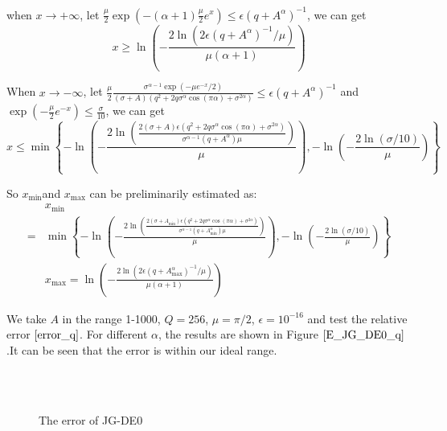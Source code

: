 when $x\rightarrow +\infty$, let $\frac{\mu}{2} \exp(-(\alpha+1)\frac{\mu}{2}e^x)\leq \epsilon (q+A^{\alpha})^{-1}$, we can get
\begin{equation}
	x\geq \ln\left(-\frac{2\ln(2\epsilon(q+A^{\alpha})^{-1}/\mu)}{\mu(\alpha+1)}\right)
\end{equation}

When $x\rightarrow -\infty$, let $\frac{\mu}{2} \frac{\sigma^{\alpha-1}\exp(-\mu e^{-x}/2)}{(\sigma+A)(q^2+2q\sigma^{\alpha}\cos(\pi\alpha)+\sigma^{2\alpha})}\leq \epsilon (q+A^{\alpha})^{-1}$ and $\exp(-\frac{\mu}{2}e^{-x})\le \frac{\sigma}{10}$, we can get
\begin{equation}
	x\leq \min \left\{-\ln\left(-\frac{2\ln\left(\frac{2(\sigma+A)\epsilon(q^2+2q\sigma^{\alpha}\cos(\pi\alpha)+\sigma^{2\alpha})}{\sigma^{\alpha-1}(q+A^{\alpha})\mu} \right)}{\mu}\right),-\ln \left(-\frac{2\ln(\sigma/10)}{\mu}\right)\right\}
\end{equation}

So  $x_{\min}$and $x_{\max}$ can be preliminarily estimated as:
\begin{equation}
	\begin{aligned}
		&x_{\min}\\
		=&\min \left\{-\ln\left(-\frac{2\ln\left(\frac{2(\sigma+A_{\min})\epsilon(q^2+2q\sigma^{\alpha}\cos(\pi\alpha)+\sigma^{2\alpha})}{\sigma^{\alpha-1}(q+A_{\min}^{\alpha})\mu} \right)}{\mu}\right),-\ln \left(-\frac{2\ln(\sigma/10)}{\mu}\right)\right\}
		\\&x_{\max}=\ln\left(-\frac{2\ln(2\epsilon(q+A_{\max}^{\alpha})^{-1}/\mu)}{\mu(\alpha+1)}\right)
\end{aligned}
\label{findminmax_DE0_q}
\end{equation}

We take $A$ in the range 1-1000, $Q=256$, $\mu=\pi/2$, $\epsilon=10^{-16}$ and test the relative error $\eqref{error_q}$. For different $\alpha $, the results are shown in Figure $\ref{E_JG_DE0_q}$.It can be seen that the error is within our ideal range.

\begin{figure}[h!]
	\centering
	~~
	~~
	\\
	~~
	~~
	\caption{The error of JG-DE0}
	\label{E_JG_DE0_q}
\end{figure}

